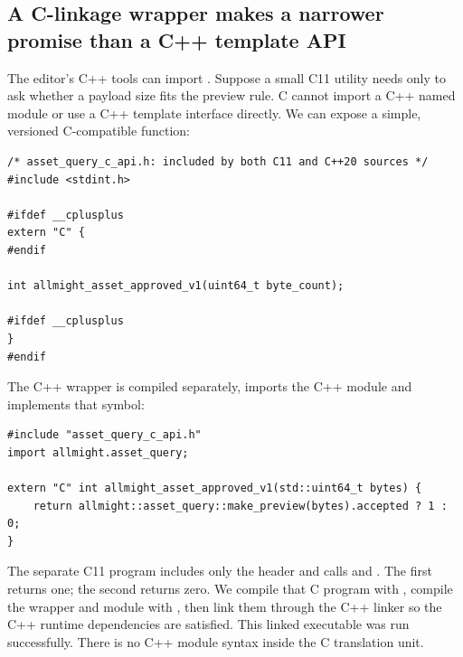 \subsection{A C-linkage wrapper makes a narrower promise than a C++ template API}\label{05-engine-i-ch006-a-c-linkage-wrapper-makes-a-narrower-promise-than-a-c-template-api}

\hypertarget{05-engine-i-ch006-a-c-linkage-wrapper-makes-a-narrower-promise-than-a-c-template-api}{}

The editor's C++ tools can import . Suppose a small C11 utility needs only to ask whether a payload size fits the preview rule. C cannot import a C++ named module or use a C++ template interface directly. We can expose a simple, versioned C-compatible function:

\begin{verbatim}
/* asset_query_c_api.h: included by both C11 and C++20 sources */
#include <stdint.h>

#ifdef __cplusplus
extern "C" {
#endif

int allmight_asset_approved_v1(uint64_t byte_count);

#ifdef __cplusplus
}
#endif
\end{verbatim}

The C++ wrapper is compiled separately, imports the C++ module and implements that symbol:

\begin{verbatim}
#include "asset_query_c_api.h"
import allmight.asset_query;

extern "C" int allmight_asset_approved_v1(std::uint64_t bytes) {
    return allmight::asset_query::make_preview(bytes).accepted ? 1 : 0;
}
\end{verbatim}

The separate C11 program includes only the header and calls  and . The first returns one; the second returns zero. We compile that C program with , compile the wrapper and module with , then link them through the C++ linker so the C++ runtime dependencies are satisfied. This linked executable was run successfully. There is no C++ module syntax inside the C translation unit.

